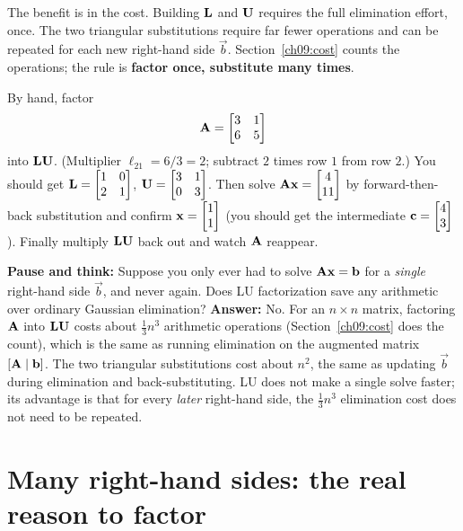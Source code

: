 The benefit is in the cost. Building $\mathbf{L}$ and $\mathbf{U}$ requires the full elimination
effort, once. The two triangular substitutions require far fewer operations and can be
repeated for each new right-hand side $\vec{b}$. Section~\ref{ch09:cost} counts the
operations; the rule is \textbf{factor once, substitute many times}.

\begin{labbox}
By hand, factor
\[
  \mathbf{A} = \begin{bmatrix} 3 & 1 \\ 6 & 5 \end{bmatrix}
\]
into $\mathbf{L}\mathbf{U}$. (Multiplier $\ell_{21}=6/3=2$; subtract $2$ times row $1$ from row
$2$.) You should get $\mathbf{L}=\begin{bmatrix}1&0\\2&1\end{bmatrix}$,
$\mathbf{U}=\begin{bmatrix}3&1\\0&3\end{bmatrix}$. Then solve $\mathbf{A}\mathbf{x}=\begin{bmatrix}4\\11\end{bmatrix}$ by
forward-then-back substitution and confirm $\mathbf{x}=\begin{bmatrix}1\\1\end{bmatrix}$ (you should get the
intermediate $\mathbf{c}=\begin{bmatrix}4\\3\end{bmatrix}$). Finally multiply
$\mathbf{L}\mathbf{U}$ back out and watch $\mathbf{A}$ reappear.
\end{labbox}

\begin{recoverybox}
\textbf{Pause and think:} Suppose you only ever had to solve $\mathbf{A}\mathbf{x}=\mathbf{b}$ for a \emph{single} right-hand side $\vec{b}$, and never again. Does LU factorization save any arithmetic over ordinary Gaussian elimination?
\textbf{Answer:} No. For an $n\times n$ matrix, factoring $\mathbf{A}$ into $\mathbf{L}\mathbf{U}$ costs about $\tfrac13 n^3$ arithmetic operations (Section~\ref{ch09:cost} does the count), which is the same as running elimination on the augmented matrix $[\mathbf{A}\mid\mathbf{b}]$. The two triangular substitutions cost about $n^2$, the same as updating $\vec{b}$ during elimination and back-substituting. LU does not make a single solve faster; its advantage is that for every \emph{later} right-hand side, the $\tfrac13 n^3$ elimination cost does not need to be repeated.
\end{recoverybox}

\section{Many right-hand sides: the real reason to factor}
\label{ch09:many-rhs}

